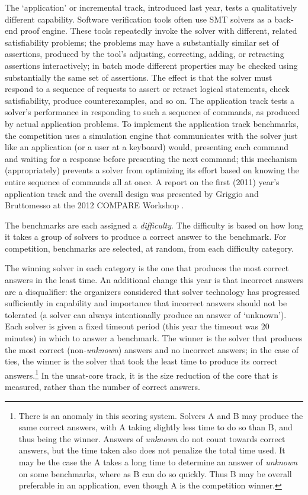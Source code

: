 \documentclass[twosize,11pt]{article}
\begin{document}
The `application' or incremental track, introduced last year, tests a qualitatively different capability. Software verification tools often use SMT solvers as a back-end proof engine. These tools repeatedly invoke the solver with different, related satisfiability problems; the problems may have a substantially similar set of assertions, produced by the tool's adjusting, correcting, adding, or retracting assertions interactively; in batch mode different properties may be checked using substantially the same set of assertions.
The effect is that the solver must respond to a sequence of requests to assert or retract logical statements, check satisfiability, produce counterexamples, and so on. The application track tests a solver's performance in responding to such a sequence of commands, as produced by actual application problems. To implement the application track benchmarks, the 
competition uses a simulation engine that communicates with the solver just like an application (or a user at a keyboard) would, presenting each command and waiting for a response before presenting the next command; this mechanism (appropriately) prevents a solver from optimizing its effort based on knowing the entire sequence of commands all at once. A report
on the first (2011) year's application track and the overall design was presented by Griggio and Bruttomesso at the 
2012 COMPARE Workshop \cite{ag+rb+12}.

The benchmarks are each assigned a {\em difficulty}. The difficulty is based on how long it takes a group of solvers to produce a correct answer to the benchmark. For competition, benchmarks are selected, at random, from each difficulty category. 

The winning solver in each category is the one that produces the most correct answers in the least time. An additional change this year is that incorrect answers are a disqualifier: the organizers considered that solver technology has progressed sufficiently in capability and importance that incorrect answers should not be tolerated (a solver can always intentionally produce an answer of `unknown'). Each solver is given a fixed timeout period (this year the timeout was 20 minutes) in which to answer a benchmark. The winner is the solver that produces the most correct (non-{\em unknown}) answers and no incorrect answers; in the case of ties, the winner is the solver that took the least time to produce its correct answers.\footnote{There is an anomaly in this scoring system. Solvers A and B may produce the same correct answers, with A taking slightly less time to do so than B, and thus being the winner. Answers of {\em unknown} do not count towards correct answers, but the time taken also does not penalize the total time used. It may be the case the A takes a long time to determine an answer of {\em unknown} on some benchmarks, where as B can do so quickly. Thus B may be overall preferable in an application, even though A is the competition winner.}
In the unsat-core track, it is the size reduction of the core that is measured, rather than the number of correct answers.
\end{document}
